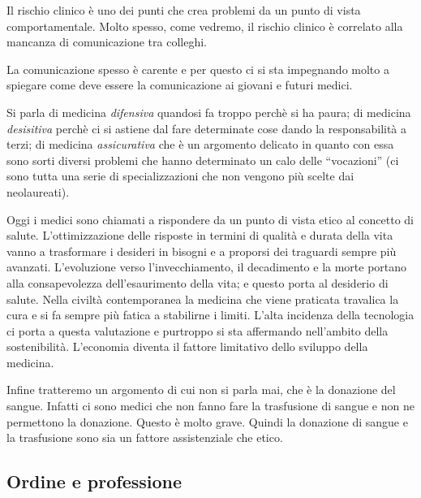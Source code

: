 Il rischio clinico è uno dei punti che crea problemi da un punto di
vista comportamentale. Molto spesso, come vedremo, il rischio clinico è
correlato alla mancanza di comunicazione tra colleghi.

La comunicazione spesso è carente e per questo ci si sta impegnando
molto a spiegare come deve essere la comunicazione ai giovani e futuri
medici.

Si parla di medicina \emph{difensiva} quandosi fa troppo perchè si ha
paura; di medicina \emph{desisitiva} perchè ci si astiene dal fare
determinate cose dando la responsabilità a terzi; di medicina
\emph{assicurativa} che è un argomento delicato in quanto con essa sono
sorti diversi problemi che hanno determinato un calo delle ``vocazioni''
(ci sono tutta una serie di specializzazioni che non vengono più scelte
dai neolaureati).

Oggi i medici sono chiamati a rispondere da un punto di vista etico al
concetto di salute. L'ottimizzazione delle risposte in termini di
qualità e durata della vita vanno a trasformare i desideri in bisogni e
a proporsi dei traguardi sempre più avanzati. L'evoluzione verso
l'invecchiamento, il decadimento e la morte portano alla consapevolezza
dell'esaurimento della vita; e questo porta al desiderio di salute.
Nella civiltà contemporanea la medicina che viene praticata travalica la
cura e si fa sempre più fatica a stabilirne i limiti. L'alta incidenza
della tecnologia ci porta a questa valutazione e purtroppo si sta
affermando nell'ambito della sostenibilità. L'economia diventa il
fattore limitativo dello sviluppo della medicina.

Infine tratteremo un argomento di cui non si parla mai, che è la
donazione del sangue. Infatti ci sono medici che non fanno fare la
trasfusione di sangue e non ne permettono la donazione. Questo è molto
grave. Quindi la donazione di sangue e la trasfusione sono sia un
fattore assistenziale che etico.

\subsection{Ordine e professione}


